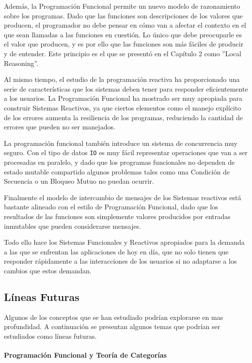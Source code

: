 \documentclass[../main.tex]{subfiles}
\begin{document}
Además, la Programación Funcional permite un nuevo modelo de razonamiento sobre los
programas. Dado que las funciones son descripciones de los valores que producen, el
programador no debe pensar en cómo van a afectar el contexto en el que sean llamadas a
las funciones en cuestión. Lo único que debe preocuparle es el valor que producen, y es
por ello que las funciones son más fáciles de producir y de entender. Este principio es
el que se presentó en el Capítulo 2 como ''Local Reasoning''.

Al mismo tiempo, el estudio de la programación reactiva ha proporcionado una serie de
características que los sistemas deben tener para responder eficientemente a los usuarios.
La Programación Funcional ha mostrado ser muy apropiada para construir Sistemas Reactivos, ya que ciertos elementos como el manejo explícito de los errores aumenta la resiliencia de
los programas, reduciendo la cantidad de errores que pueden no ser manejados.

La programación funcional también introduce un sistema de concurrencia muy seguro.
Con el tipo de datos \texttt{IO} es muy fácil representar operaciones que van a ser
procesadas en paralelo, y dado que los programas funcionales no dependen de estado
mutable compartido algunos problemas tales como una Condición de Secuencia o un Bloqueo
Mutuo no puedan ocurrir.

Finalmente el modelo de intercambio de mensajes de los Sistemas reactivos está bastante
alineado con el estilo de Programación Funcional, dado que los resultados de las funciones
son simplemente valores producidos por entradas inmutables que pueden considerarse mensajes.

Todo ello hace los Sistemas Funcionales y Reactivos apropiados para la demanda a las que
se enfrentan las aplicaciones de hoy en día, que no solo tienen que responder rápidamente
a las interacciones de los usuarios si no adaptarse a los cambios que estos demandan.

\subsection{Líneas Futuras}
Algunos de los conceptos que se han estudiado podrían explorarse en mas profundidad. A continuación
se presentan algunos temas que podrían ser estudiados como líneas futuras.


\paragraph{Programación Funcional y Teoría de Categorías}
\end{document}

